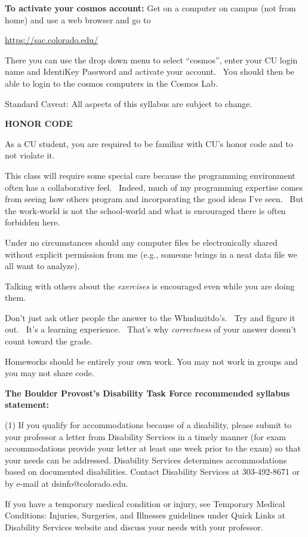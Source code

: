 \documentclass[]{article}
\begin{document}
\textbf{To activate your cosmos account:} Get on a computer on campus
(not from home) and use a web browser and go to


\url{https://sac.colorado.edu/}


There you can use the drop down menu to select ``cosmos'', enter your CU
login name and IdentiKey Password and activate your account.~ You should
then be able to login to the cosmos computers in the Cosmos Lab.


Standard Caveat: All aspects of this syllabus are subject to change.

\textbf{HONOR CODE}


As a CU student, you are required to be familiar with CU's honor code
and to not violate it.


This class will require some special care because the programming
environment often has a collaborative feel.~ Indeed, much of my
programming expertise comes from seeing how others program and
incorporating the good ideas I've seen.~ But the work-world is not the
school-world and what is encouraged there is often forbidden here. ~


Under no circumstances should any computer files be electronically
shared without explicit permission from me (e.g., someone brings in a
neat data file we all want to analyze). ~


Talking with others about the \emph{exercises} is encouraged even while
you are doing them.


Don't just ask other people the answer to the Whuduzitdo's.~ Try and
figure it out.~ It's a learning experience.~ That's why
\emph{correctness} of your answer doesn't count toward the grade.


Homeworks should be entirely your own work.  You may not work in groups and you
may not share code.






\textbf{The Boulder Provost's Disability Task Force recommended syllabus statement:}

(1)  If you qualify for accommodations because of a disability, please submit to
your professor a letter from Disability Services in a timely manner (for exam
accommodations provide your letter at least one week prior to the exam) so that
your needs can be addressed. Disability Services determines accommodations
based on documented disabilities. Contact Disability Services at 303-492-8671
or by e-mail at dsinfo@colorado.edu.

If you have a temporary medical condition or injury, see Temporary Medical
Conditions: Injuries, Surgeries, and Illnesses guidelines under Quick Links at
Disability Services website and discuss your needs with your professor.
\end{document}
